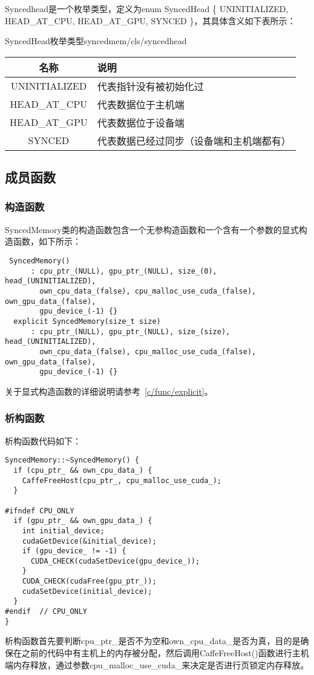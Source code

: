 Syncedhead是一个枚举类型，定义为enum SyncedHead \{ UNINITIALIZED, HEAD\_AT\_CPU, HEAD\_AT\_GPU, SYNCED \}，其具体含义如下表所示：
\begin{cntable}{SyncedHead枚举类型}{syncedmem/cls/syncedhead}
  \begin{tabular}{|c|l|}
    \hline
    名称 & 说明 \\ \hline
    UNINITIALIZED & 代表指针没有被初始化过 \\ \hline
    HEAD\_AT\_CPU & 代表数据位于主机端 \\ \hline
    HEAD\_AT\_GPU & 代表数据位于设备端 \\ \hline
    SYNCED & 代表数据已经过同步（设备端和主机端都有） \\ \hline
  \end{tabular}
\end{cntable}
\subsection{成员函数}
\subsubsection{构造函数}
SyncedMemory类的构造函数包含一个无参构造函数和一个含有一个参数的显式构造函数，如下所示：
\begin{verbatim}
 SyncedMemory()
      : cpu_ptr_(NULL), gpu_ptr_(NULL), size_(0), head_(UNINITIALIZED),
        own_cpu_data_(false), cpu_malloc_use_cuda_(false), own_gpu_data_(false),
        gpu_device_(-1) {}
  explicit SyncedMemory(size_t size)
      : cpu_ptr_(NULL), gpu_ptr_(NULL), size_(size), head_(UNINITIALIZED),
        own_cpu_data_(false), cpu_malloc_use_cuda_(false), own_gpu_data_(false),
        gpu_device_(-1) {}
\end{verbatim}
关于显式构造函数的详细说明请参考~\ref{c/func/explicit}。
\subsubsection{析构函数}
析构函数代码如下：
\begin{verbatim}
SyncedMemory::~SyncedMemory() {
  if (cpu_ptr_ && own_cpu_data_) {
    CaffeFreeHost(cpu_ptr_, cpu_malloc_use_cuda_);
  }

#ifndef CPU_ONLY
  if (gpu_ptr_ && own_gpu_data_) {
    int initial_device;
    cudaGetDevice(&initial_device);
    if (gpu_device_ != -1) {
      CUDA_CHECK(cudaSetDevice(gpu_device_));
    }
    CUDA_CHECK(cudaFree(gpu_ptr_));
    cudaSetDevice(initial_device);
  }
#endif  // CPU_ONLY
}  
\end{verbatim}
析构函数首先要判断cpu\_ptr\_是否不为空和own\_cpu\_data\_是否为真，目的是确保在之前的代码中有主机上的内存被分配，然后调用CaffeFreeHost()函数进行主机端内存释放，通过参数cpu\_malloc\_use\_cuda\_来决定是否进行页锁定内存释放。

